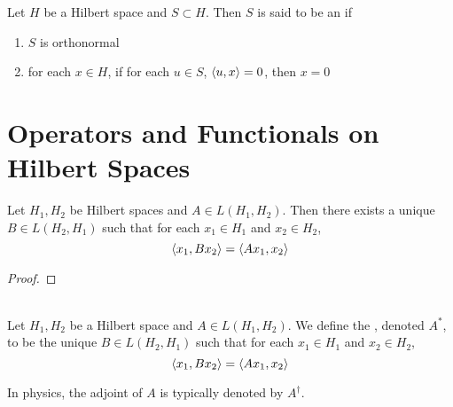 \documentclass{book}
\begin{document}
\begin{defn} \ld{}
	Let $H$ be a Hilbert space and $S \subset H$. Then $S$ is said to be an  if 
	\begin{enumerate}
	\item $S$ is orthonormal
	\item for each $x \in H$, if for each $u \in S$, $\langle u, x \rangle = 0$, then $x =0$
	\end{enumerate}
\end{defn}






































\newpage

\section{Operators and Functionals on Hilbert Spaces}

\begin{ex}
	Let $H_1,H_2$ be Hilbert spaces and $A \in L(H_1, H_2)$. Then there exists a unique $B \in L(H_2, H_1)$ such that for each $x_1 \in H_1$ and $x_2 \in H_2$, 
	$$\langle x_1 , Bx_2 \rangle = \langle A x_1 , x_2 \rangle$$  
\end{ex}

\begin{proof}
\end{proof}

\begin{defn} \ld{} \\
	Let $H_1,H_2$ be a Hilbert space and $A \in L(H_1, H_2)$. We define the , denoted $A^*$, to be the unique $B \in L(H_2, H_1)$ such that for each $x_1 \in H_1$ and $x_2 \in H_2$, 
	$$\langle x_1 , Bx_2 \rangle = \langle A x_1 , x_2 \rangle$$  
\end{defn}

\begin{note}
	In physics, the adjoint of $A$ is typically denoted by $A^{\dagger}$.
\end{note}
\end{document}
